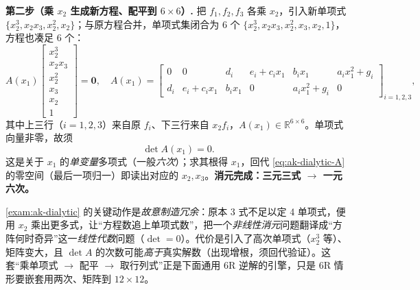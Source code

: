 \begin{example}
\textbf{第二步（乘 $x_2$ 生成新方程、配平到 $6\times6$）.} 把 $f_1,f_2,f_3$ 各乘 $x_2$，引入新单项式 $\{x_2^3,x_2x_3,x_2^2,x_2\}$；与原方程合并，单项式集闭合为 $6$ 个 $\{x_2^3,x_2x_3,x_2^2,x_3,x_2,1\}$，方程也凑足 $6$ 个：
\begin{equation}
A(x_1)\begin{bmatrix}x_2^3\\x_2x_3\\x_2^2\\x_3\\x_2\\1\end{bmatrix}=\mathbf{0},\quad
A(x_1)=\begin{bmatrix}
0&0&d_i&e_i+c_ix_1&b_ix_1&a_ix_1^2+g_i\\[-1pt]
d_i&e_i+c_ix_1&b_ix_1&0&a_ix_1^2+g_i&0
\end{bmatrix}_{i=1,2,3},
\label{eq:ak-dialytic-A}
\end{equation}
其中上三行（$i=1,2,3$）来自原 $f_i$、下三行来自 $x_2f_i$，$A(x_1)\in\mathbb{R}^{6\times6}$。单项式向量非零，故须
\begin{equation}
\det A(x_1)=0.
\label{eq:ak-dialytic-det}
\end{equation}
这是关于 $x_1$ 的\emph{单变量}多项式（一般\emph{六次}）；求其根得 $x_1$，回代 \cref{eq:ak-dialytic-A} 的零空间（最后一项归一）即读出对应的 $x_2,x_3$。\textbf{消元完成：三元三式 $\to$ 一元六次。}
\end{example}

\begin{insight}\label{ins:ak-dialytic}
\cref{exam:ak-dialytic} 的关键动作是\emph{故意制造冗余}：原本 3 式不足以定 4 单项式，便用 $x_2$ 乘出更多式，让“方程数追上单项式数”，把一个\emph{非线性消元}问题翻译成“方阵何时奇异”这一\emph{线性代数}问题（$\det=0$）。代价是引入了高次单项式（$x_2^3$ 等）、矩阵变大，且 $\det A$ 的次数可能\emph{高于}真实解数（出现增根，须回代验证）。这套“乘单项式 $\to$ 配平 $\to$ 取行列式”正是下面通用 6R 逆解的引擎，只是 6R 情形要嵌套用两次、矩阵到 $12\times12$。
\end{insight}

